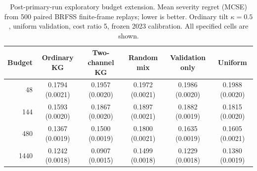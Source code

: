 \begin{table}[t]
\centering
\small
\caption{Post-primary-run exploratory budget extension. Mean severity regret (MCSE) from 500 paired BRFSS finite-frame replays; lower is better. Ordinary tilt $\kappa=0.5$, uniform validation, cost ratio 5, frozen 2023 calibration. All specified cells are shown.}
\label{tab:exploratory_budget}
\begin{tabular}{rccccc}
\toprule
Budget & Ordinary KG & Two-channel KG & Random mix & Validation only & Uniform \\
\midrule
48 & 0.1794 (0.0021) & 0.1957 (0.0020) & 0.1972 (0.0021) & 0.1986 (0.0020) & 0.1988 (0.0020) \\
144 & 0.1593 (0.0020) & 0.1867 (0.0020) & 0.1897 (0.0021) & 0.1882 (0.0019) & 0.1815 (0.0020) \\
480 & 0.1367 (0.0019) & 0.1500 (0.0019) & 0.1800 (0.0021) & 0.1635 (0.0019) & 0.1605 (0.0021) \\
1440 & 0.1242 (0.0018) & 0.0907 (0.0015) & 0.1499 (0.0018) & 0.1229 (0.0018) & 0.1380 (0.0019) \\
\bottomrule
\end{tabular}
\end{table}

